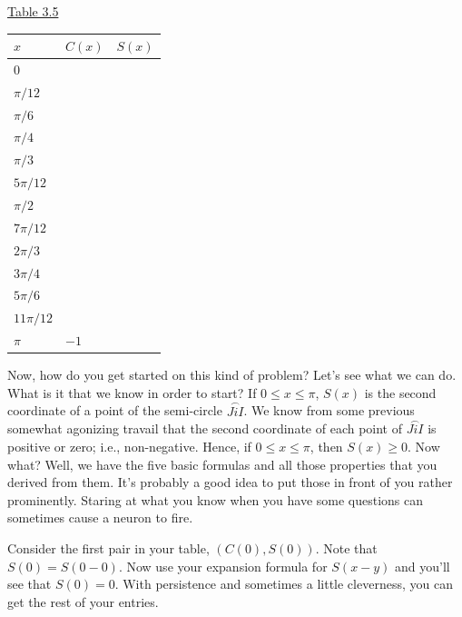 \documentclass[english]{book}
\newcommand{\arc}[1]{\overset{\frown}{#1} }
\begin{document}
\begin{center}
\underline{Table 3.5}
\end{center}
\begin{table}[htbp]
\begin{center}
\begin{tabular}{|l|l|l|}
  \hline 
  $x$        & $C(x)$ & $S(x)$ \\
  \hline 
  $0$        & \qquad & \qquad \\
  $\pi/12$   &        &        \\
  $\pi/6$    &        &        \\
  $\pi/4$    &        &        \\
  $\pi/3$    &        &        \\
  $5\pi/12$  &        &        \\
  $\pi/2$    &        &        \\
  $7\pi/12$  &        &        \\
  $2\pi/3$   &        &        \\
  $3\pi/4$   &        &        \\
  $5\pi/6$   &        &        \\
  $11\pi/12$ &        &        \\
  $\pi$      &  $-1$  &        \\
  \hline
\end{tabular}
\label{tbl3.5}
\end{center}
\end{table}

Now, how do you get started on this kind of problem? Let's see what we can do. What is it that we know in order to start? If $0 \leq x \leq \pi$, $S(x)$ is the second coordinate of a point of the semi-circle $\arc{JiI}$. We know from some previous somewhat agonizing travail that the second coordinate of each point of $\arc{JiI}$ is positive or zero; i.e., non-negative. Hence, if $0 \leq x \leq \pi$, then $S(x) \geq 0$. Now what? Well, we have the five basic formulas and all those properties that you derived from them. It's probably a good idea to put those in front of you rather prominently. Staring at what you know when you have some questions can sometimes cause a neuron to fire. 

Consider the first pair in your table, $(C(0),S(0))$. Note that $S(0) = S(0-0)$. Now use your expansion formula for $S(x-y)$ and you'll see that $S(0) = 0$. With persistence and sometimes a little cleverness, you can get the rest of your entries.
\end{document}

